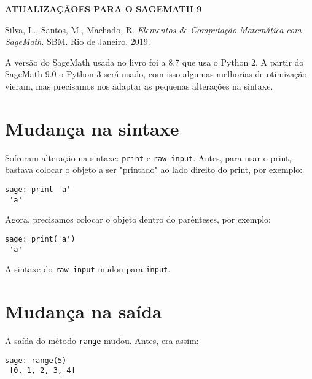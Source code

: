 \documentclass[10pt,a4paper]{report}
\begin{document}
\thispagestyle{empty}










\begin{center}
{\bf ATUALIZAÇÃOES PARA O SAGEMATH 9 }
\end{center}

\noindent
Silva, L., Santos, M., Machado, R. \textit{Elementos de Computação Matemática com SageMath}. SBM. Rio de Janeiro. 2019.


\vspace{1cm}

A versão do SageMath usada no livro foi a 8.7 que usa o Python 2. 
A partir do SageMath 9.0 o Python 3 será usado, com isso algumas melhorias de otimização vieram, mas precisamos nos adaptar as pequenas alterações na sintaxe.


\section*{Mudança na sintaxe}


Sofreram alteração na sintaxe:
\verb|print| e \verb|raw_input|.
Antes, para usar o print, bastava colocar o objeto a ser "printado" ao lado direito do print, por exemplo:
\begin{lstlisting}[frame=e, numbers=none, xleftmargin=0em]
sage: print 'a'
 'a'
\end{lstlisting}

Agora, precisamos colocar o objeto dentro do parênteses, por exemplo:
\begin{lstlisting}[frame=e, numbers=none, xleftmargin=0em]
sage: print('a')
 'a' 
\end{lstlisting}

A sintaxe do \verb|raw_input| mudou para \verb|input|.

\section*{Mudança na saída}


A saída do método \verb|range| mudou.
Antes, era assim:
\begin{lstlisting}[frame=e, numbers=none, xleftmargin=0em]
sage: range(5)
 [0, 1, 2, 3, 4]
\end{lstlisting}
\end{document}
